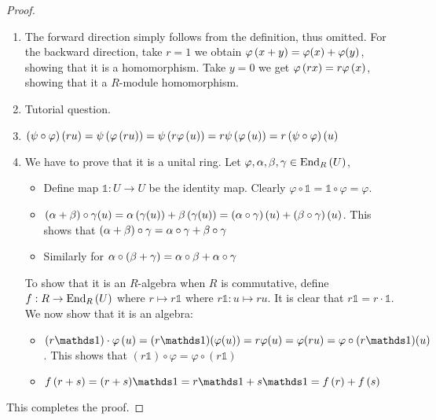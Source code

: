 \begin{proof}
    \hfill
    \begin{enumerate}
        \item The forward direction simply follows from the definition, thus omitted. For the backward direction, take $r=1$ we obtain $\varphi\left(x+y\right)=\varphi(x) + \varphi(y)$, showing that it is a homomorphism. Take $y=0$ we get $\varphi\left(rx\right)=r\varphi\left(x\right)$, showing that it a $R$-module homomorphism.
        \item Tutorial question.
        \item $\left(\psi\circ\varphi\right)\left(ru\right) = \psi \left(\varphi \left(ru\right)\right)=\psi \left(r\varphi \left(u\right)\right)=r\psi \left(\varphi \left(u\right)\right)=r\left(\psi\circ\varphi\right) \left(u\right)$
        \item We have to prove that it is a unital ring. Let $\varphi,\alpha,\beta,\gamma\in \operatorname{End}_R\left(U\right)$,
        \begin{itemize}
            \item Define map $\mathds 1:U\to U$ be the identity map. Clearly $\varphi\circ \mathds 1 = \mathds 1\circ \varphi = \varphi$.
            \item $\left(\alpha+\beta\right)\circ\gamma(u) = \alpha\left(\gamma(u)\right)+\beta\left(\gamma(u)\right) = \left(\alpha\circ\gamma\right) (u) + \left(\beta\circ\gamma\right)(u)$. This shows that $\left(\alpha + \beta\right)\circ \gamma = \alpha\circ \gamma + \beta \circ \gamma$
            \item Similarly for $\alpha\circ\left(\beta +\gamma\right) = \alpha \circ \beta + \alpha\circ \gamma$
        \end{itemize}
        To show that it is an $R$-algebra when $R$ is commutative, define $f:R\to \operatorname{End}_R\left(U\right)$ where $r\mapsto r\mathds 1$ where $r\mathds 1:u\mapsto ru$. It is clear that $r\mathds1 = r\cdot \mathds 1$. We now show that it is an algebra:
        \begin{itemize}
            \item $(r\mathds1)\cdot \func{\varphi}{u} = (r\mathds1)(\varphi(u)) = r\varphi(u) = \varphi(ru) = \varphi\circ(r\mathds1)(u)$. This shows that $(r\mathds1)\circ\varphi = \varphi \circ (r\mathds1)$
            \item $\func{f}{r+s} = (r+s)\mathds1 = r\mathds1 + s\mathds1 = \func{f}{r} + \func{f}{s}$
        \end{itemize}
    \end{enumerate}
    This completes the proof.
\end{proof}

